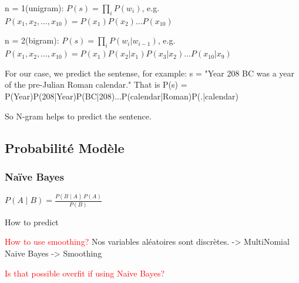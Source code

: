\documentclass[a4paper]{article}
\begin{document}
n = 1(unigram): $P(s)=\prod\limits_{i}P(w_i)$, e.g. $P(x_1,x_2,...,x_{10}) = P(x_1)P(x_2)...P(x_{10})$

n = 2(bigram): $P(s)=\prod\limits_{i}P(w_i|w_{i-1})$, e.g. $P(x_1,x_2,...,x_{10}) = P(x_1)P(x_2|x_1)P(x_3|x_2)...P(x_{10}|x_9)$

For our case, we predict the sentense, for example: 
s = "Year 208 BC was a year of the pre-Julian Roman calendar." 
That is P(s) = P(Year)P(208|Year)P(BC|208)...P(calendar|Roman)P(.|calendar)

So N-gram helps to predict the sentence.

\subsection{Probabilité Modèle}
\subsubsection{Naïve Bayes}
$ P(A \mid B) = \frac{P(B \mid A) \, P(A)}{P(B)} $

How to predict

\textcolor{red}{How to use smoothing?}
{ Nos variables aléatoires sont discrètes. -> MultiNomial Naive Bayes -> Smoothing}

\textcolor{red}{Is that possible overfit if using Naive Bayes?}
\end{document}
